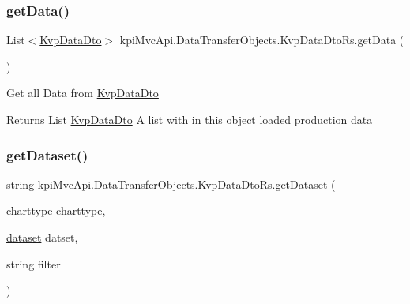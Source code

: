 \subsubsection{\texorpdfstring{get\+Data()}{getData()}\hspace{0.1cm}{\footnotesize\ttfamily [2/2]}}
{\footnotesize\ttfamily List$<$\hyperlink{classkpi_mvc_api_1_1_data_transfer_objects_1_1_kvp_data_dto}{Kvp\+Data\+Dto}$>$ kpi\+Mvc\+Api.\+Data\+Transfer\+Objects.\+Kvp\+Data\+Dto\+Rs.\+get\+Data (\begin{DoxyParamCaption}{ }\end{DoxyParamCaption})\hspace{0.3cm}{\ttfamily [inline]}}



Get all Data from {\ttfamily \hyperlink{classkpi_mvc_api_1_1_data_transfer_objects_1_1_kvp_data_dto}{Kvp\+Data\+Dto}} 

\begin{DoxyReturn}{Returns}
{\ttfamily  List \hyperlink{classkpi_mvc_api_1_1_data_transfer_objects_1_1_kvp_data_dto}{Kvp\+Data\+Dto} } A list with in this object loaded production data 
\end{DoxyReturn}
\mbox{\label{classkpi_mvc_api_1_1_data_transfer_objects_1_1_kvp_data_dto_rs_aded42b5e75fcbc416d4ac02875c34849}} 
\subsubsection{\texorpdfstring{get\+Dataset()}{getDataset()}\hspace{0.1cm}{\footnotesize\ttfamily [1/2]}}
{\footnotesize\ttfamily string kpi\+Mvc\+Api.\+Data\+Transfer\+Objects.\+Kvp\+Data\+Dto\+Rs.\+get\+Dataset (\begin{DoxyParamCaption}\item[{\hyperlink{classkpi_mvc_api_1_1_data_transfer_objects_1_1_kvp_data_dto_rs_a829c595d537885ae923de884be501246}{charttype}}]{charttype,  }\item[{\hyperlink{classkpi_mvc_api_1_1_data_transfer_objects_1_1_kvp_data_dto_rs_aec5ef29d115053aa1f78d15adc7e1373}{dataset}}]{datset,  }\item[{string}]{filter }\end{DoxyParamCaption})\hspace{0.3cm}{\ttfamily [inline]}}



